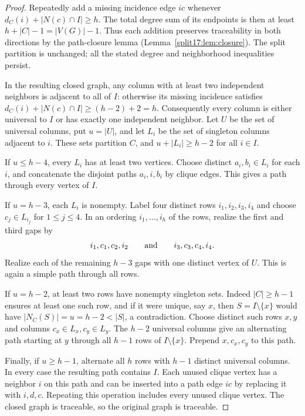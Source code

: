 \documentclass[11pt,a4paper]{article}
\theoremstyle{definition}\newtheorem{definition}[theorem]{Definition}
\theoremstyle{remark}\newtheorem{remark}[theorem]{Remark}
\begin{document}
\begin{proof}
Repeatedly add a missing incidence edge $ic$ whenever
$d_C(i)+|N(c)\cap I|\ge h$. The total degree sum of its endpoints
is then at least $h+|C|-1=|V(G)|-1$. Thus each addition preserves
traceability in both directions by the path-closure lemma
(Lemma~\ref{split17:lem:closure}). The split partition is unchanged;
all the stated degree and neighborhood inequalities persist.

In the resulting closed graph, any column with at least two
independent neighbors is adjacent to all of $I$: otherwise its
missing incidence satisfies $d_C(i)+|N(c)\cap I|\ge(h-2)+2=h$.
Consequently every column is either universal to $I$ or has exactly
one independent neighbor. Let $U$ be the set of universal columns,
put $u=|U|$, and let $L_i$ be the set of singleton columns adjacent
to $i$. These sets partition $C$, and
$u+|L_i|\ge h-2$ for all $i\in I$.

If $u\le h-4$, every $L_i$ has at least two vertices. Choose distinct
$a_i,b_i\in L_i$ for each $i$, and concatenate the disjoint paths
$a_i,i,b_i$ by clique edges. This gives a path through every vertex
of $I$.

If $u=h-3$, each $L_i$ is nonempty. Label four distinct rows
$i_1,i_2,i_3,i_4$ and choose $c_j\in L_{i_j}$ for $1\le j\le4$.
In an ordering $i_1,\ldots,i_h$ of the rows, realize the first
and third gaps by
\[
 i_1,c_1,c_2,i_2\qquad\hbox{and}\qquad
 i_3,c_3,c_4,i_4.
\]
Realize each of the remaining $h-3$ gaps with one distinct vertex
of $U$. This is again a simple path through all rows.

If $u=h-2$, at least two rows have nonempty singleton sets.
Indeed $|C|\ge h-1$ ensures at least one such row, and if it were
unique, say $x$, then $S=I\setminus\{x\}$ would have
$|N_C(S)|=u=h-2<|S|$, a contradiction. Choose distinct such rows
$x,y$ and columns $c_x\in L_x,c_y\in L_y$. The $h-2$ universal
columns give an alternating path starting at $y$ through all $h-1$
rows of $I\setminus\{x\}$. Prepend $x,c_x,c_y$ to this path.

Finally, if $u\ge h-1$, alternate all $h$ rows with $h-1$ distinct
universal columns. In every case the resulting path contains $I$.
Each unused clique vertex has a neighbor $i$ on this path and can
be inserted into a path edge $ic$ by replacing it with $i,d,c$.
Repeating this operation includes every unused clique vertex.
The closed graph is traceable, so the original graph is traceable.
\end{proof}
\end{document}
